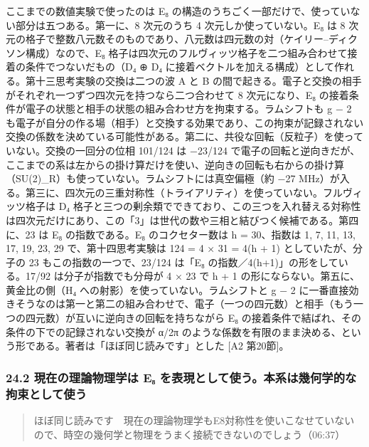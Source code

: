\documentclass[
  a4paper,
]{ltjsarticle}
\begin{document}
ここまでの数値実験で使ったのは E₈
の構造のうちごく一部だけで、使っていない部分は五つある。第一に、8
次元のうち 4 次元しか使っていない。E₈ は 8
次元の格子で整数八元数そのものであり、八元数は四元数の対（ケイリー--ディクソン構成）なので、E₈
格子は四次元のフルヴィッツ格子を二つ組み合わせて接着の条件でつないだもの（D₄
⊕ D₄
に接着ベクトルを加える構成）として作れる。第十三思考実験の交換は二つの波
A と B
の間で起きる。電子と交換の相手がそれぞれ一つずつ四次元を持つなら二つ合わせて
8 次元になり、E₈
の接着条件が電子の状態と相手の状態の組み合わせ方を拘束する。ラムシフトも
g − 2
も電子が自分の作る場（相手）と交換する効果であり、この拘束が記録されない交換の係数を決めている可能性がある。第二に、共役な回転（反粒子）を使っていない。交換の一回分の位相
101/124 は −23/124
で電子の回転と逆向きだが、ここまでの系は左からの掛け算だけを使い、逆向きの回転も右からの掛け算（SU(2)\_R）も使っていない。ラムシフトには真空偏極（約
−27
MHz）が入る。第三に、四次元の三重対称性（トライアリティ）を使っていない。フルヴィッツ格子は
D₄
格子と三つの剰余類でできており、この三つを入れ替える対称性は四次元だけにあり、この「3」は世代の数や三相と結びつく候補である。第四に、23
は E₈ の指数である。E₈ のコクセター数は h = 30、指数は 1, 7, 11, 13, 17,
19, 23, 29 で、第十四思考実験は 124 = 4 × 31 = 4(h + 1)
としていたが、分子の 23 もこの指数の一つで、23/124 は「E₈
の指数／4(h+1)」の形をしている。17/92 は分子が指数でも分母が 4 × 23 で h
+ 1 の形にならない。第五に、黄金比の側（H₄
への射影）を使っていない。ラムシフトと g − 2
に一番直接効きそうなのは第一と第二の組み合わせで、電子（一つの四元数）と相手（もう一つの四元数）が互いに逆向きの回転を持ちながら
E₈ の接着条件で結ばれ、その条件の下での記録されない交換が α/2π
のような係数を有限のまま決める、という形である。著者は「ほぼ同じ読みです」とした
{[}A2 第20節{]}。

\subsubsection{24.2 現在の理論物理学は E₈
を表現として使う。本系は幾何学的な拘束として使う}\label{ux73feux5728ux306eux7406ux8ad6ux7269ux7406ux5b66ux306f-eux2088-ux3092ux8868ux73feux3068ux3057ux3066ux4f7fux3046ux672cux7cfbux306fux5e7eux4f55ux5b66ux7684ux306aux62d8ux675fux3068ux3057ux3066ux4f7fux3046}

\begin{quote}
ほぼ同じ読みです　現在の理論物理学もE8対称性を使いこなせていないので、時空の幾何学と物理をうまく接続できないのでしょう（06:37）
\end{quote}
\end{document}
